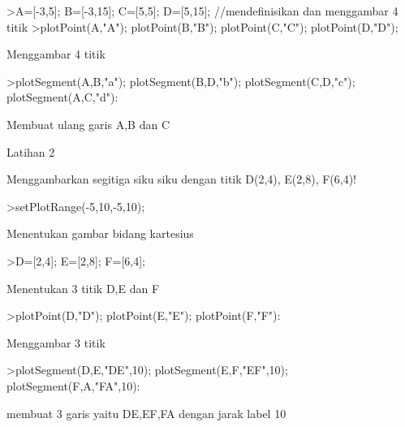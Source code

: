 \documentclass[a4paper,10pt]{article}
\begin{document}
\begin{eulernotebook}
\begin{eulercomment}
\begin{eulercomment}
\begin{eulerprompt}
>A=[-3,5]; B=[-3,15]; C=[5,5]; D=[5,15]; //mendefinisikan dan menggambar 4 titik
>plotPoint(A,"A"); plotPoint(B,"B"); plotPoint(C,"C"); plotPoint(D,"D");
\end{eulerprompt}
\begin{eulercomment}
Menggambar 4 titik
\end{eulercomment}
\begin{eulerprompt}
>plotSegment(A,B,"a"); plotSegment(B,D,"b"); plotSegment(C,D,"c"); plotSegment(A,C,"d"):
\end{eulerprompt}
\begin{eulercomment}
Membuat ulang garis A,B dan C

Latihan 2\\
\end{eulercomment}
\eulersubheading{}
\begin{eulercomment}
Menggambarkan segitiga siku siku dengan titik D(2,4), E(2,8), F(6,4)!
\end{eulercomment}
\begin{eulerprompt}
>setPlotRange(-5,10,-5,10);
\end{eulerprompt}
\begin{eulercomment}
Menentukan gambar bidang kartesius
\end{eulercomment}
\begin{eulerprompt}
>D=[2,4]; E=[2,8]; F=[6,4];
\end{eulerprompt}
\begin{eulercomment}
Menentukan 3 titik D,E dan F
\end{eulercomment}
\begin{eulerprompt}
>plotPoint(D,"D"); plotPoint(E,"E"); plotPoint(F,"F"):
\end{eulerprompt}
\begin{eulercomment}
Menggambar 3 titik
\end{eulercomment}
\begin{eulerprompt}
>plotSegment(D,E,"DE",10); plotSegment(E,F,"EF",10); plotSegment(F,A,"FA",10):
\end{eulerprompt}
\begin{eulercomment}
membuat 3 garis yaitu DE,EF,FA dengan jarak label 10

\end{eulercomment}
\end{eulercomment}
\end{eulercomment}
\end{eulernotebook}
\end{document}
